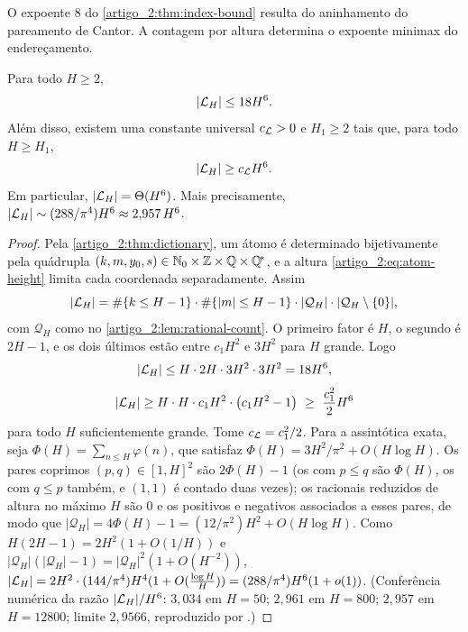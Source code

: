 O expoente $8$ do \cref{artigo_2:thm:index-bound} resulta do aninhamento do pareamento de Cantor. A contagem por altura determina o expoente minimax do endereçamento.

\begin{lemma}\label{map:artigo_2:3.2}\label{artigo_2:lem:atom-count}
Para todo $H\ge2$,
\begin{equation}
 |\mathcal{L}_H|\le18H^6.
 \label{artigo_2:eq:atom-count-upper}
\end{equation}
Além disso, existem uma constante universal $c_{\mathcal{L}}>0$ e $H_1\ge2$ tais
que, para todo $H\ge H_1$,
\begin{equation}
 |\mathcal{L}_H|\ge c_{\mathcal{L}} H^6.
 \label{artigo_2:eq:atom-count}
\end{equation}
Em particular, $|\mathcal{L}_H|=\Theta(H^6)$. Mais precisamente, $|\mathcal{L}_H|\sim(288/\pi^4)H^6\approx2{,}957\,H^6$.
\end{lemma}

\begin{proof}
Pela \cref{artigo_2:thm:dictionary}, um átomo é determinado bijetivamente pela quádrupla $(k,m,y_0,s)\in\mathbb{N}_0\times\mathbb{Z}\times\mathbb{Q}\times\mathbb{Q}^{\!*}$, e a altura \eqref{artigo_2:eq:atom-height} limita cada coordenada separadamente. Assim
\[
 |\mathcal{L}_H|=\#\{k\le H-1\}\cdot\#\{|m|\le H-1\}\cdot|\mathcal{Q}_H|\cdot|\mathcal{Q}_H\setminus\{0\}|,
\]
com $\mathcal{Q}_H$ como no \cref{artigo_2:lem:rational-count}. O primeiro fator é $H$, o segundo é $2H-1$, e os dois últimos estão entre $c_1H^2$ e $3H^2$ para $H$ grande. Logo
\[
 |\mathcal{L}_H|\le H\cdot 2H\cdot 3H^2\cdot 3H^2=18H^6,
\]
\[
 |\mathcal{L}_H|\ge H\cdot H\cdot c_1H^2\cdot\bigl(c_1H^2-1\bigr)\ \ge\ \frac{c_1^2}{2}H^6
\]
para todo $H$ suficientemente grande. Tome $c_{\mathcal{L}}=c_1^2/2$. Para a assintótica exata, seja $\Phi(H)=\sum_{n\le H}\varphi(n)$, que satisfaz $\Phi(H)=3H^2/\pi^2+O(H\log H)$. Os pares coprimos $(p,q)\in[1,H]^2$ são $2\Phi(H)-1$ (os com $p\le q$ são $\Phi(H)$, os com $q\le p$ também, e $(1,1)$ é contado duas vezes); os racionais reduzidos de altura no máximo $H$ são $0$ e os positivos e negativos associados a esses pares, de modo que $|\mathcal Q_H|=4\Phi(H)-1=(12/\pi^2)H^2+O(H\log H)$. Como $H(2H-1)=2H^2(1+O(1/H))$ e $|\mathcal Q_H|(|\mathcal Q_H|-1)=|\mathcal Q_H|^2(1+O(H^{-2}))$, $|\mathcal{L}_H|=2H^2\cdot(144/\pi^4)H^4(1+O(\tfrac{\log H}{H}))=(288/\pi^4)H^6(1+o(1))$. (Conferência numérica da razão $|\mathcal{L}_H|/H^6$: $3{,}034$ em $H=50$; $2{,}961$ em $H=800$; $2{,}957$ em $H=12800$; limite $2{,}9566$, reproduzido por .)
\end{proof}

